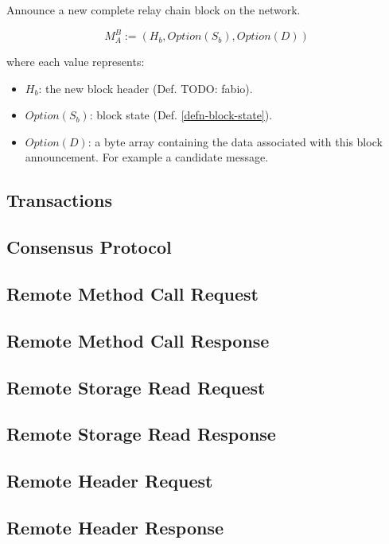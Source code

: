 \documentclass{book}
\newcommand{\todo}[1]{}
\renewcommand{\todo}[1]{{\color{red} TODO: {#1}}}
\begin{document}
Announce a new complete relay chain block on the network.

\[
    M^B_A := (H_b, Option(S_b), Option(D))
\]

where each value represents:

\begin{itemize}
    \item $H_b$: the new block header (Def. \todo{fabio}).
    \item $Option(S_b)$: block state (Def. \ref{defn-block-state}).
    \item $Option(D)$: a byte array containing the data associated with this
    block announcement. For example a candidate message.
\end{itemize}

\subsection{Transactions}

\subsection{Consensus Protocol}

\subsection{Remote Method Call Request}

\subsection{Remote Method Call Response}

\subsection{Remote Storage Read Request}

\subsection{Remote Storage Read Response}

\subsection{Remote Header Request}

\subsection{Remote Header Response}
\end{document}
